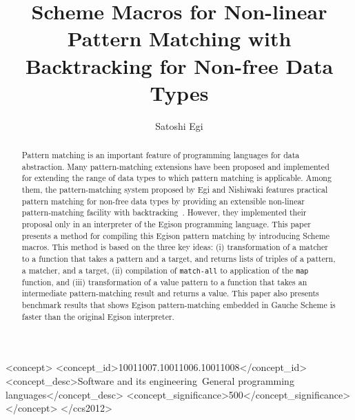 \documentclass[acmlarge]{acmart}
\newcommand{\new}[1]{\textcolor{blue}{#1}}
\begin{document}
\setlength{\pdfpageheight}{\paperheight}
\setlength{\pdfpagewidth}{\paperwidth}

\title{Scheme Macros for Non-linear Pattern Matching with Backtracking for Non-free Data Types}

\author{Satoshi Egi}

\begin{abstract}
  Pattern matching is an important feature of programming languages for data abstraction.
  Many pattern-matching extensions have been proposed and implemented for extending the range of data types to which pattern matching is applicable.
  Among them, the pattern-matching system proposed by Egi and Nishiwaki features practical pattern matching for non-free data types by providing an extensible non-linear pattern-matching facility with backtracking~\cite{egi2018aplas}.
  However, they implemented their proposal only in an interpreter of the Egison programming language.
  This paper presents a method for compiling this Egison pattern matching by introducing Scheme macros.
  This method is based on the three key ideas: (i) transformation of a matcher to a function that takes a pattern and a target, and returns lists of triples of a pattern, a matcher, and a target, (ii) compilation of \texttt{match-all} to application of the \texttt{map} function, and (iii) transformation of a value pattern to a function that takes an intermediate pattern-matching result and returns a value.
  This paper also presents benchmark results that shows Egison pattern-matching embedded in Gauche Scheme is faster than the original Egison interpreter.
\end{abstract}

\begin{CCSXML}
<concept>
<concept_id>10011007.10011006.10011008</concept_id>
<concept_desc>Software and its engineering~General programming languages</concept_desc>
<concept_significance>500</concept_significance>
</concept>
</ccs2012>
\end{CCSXML}

\end{document}
